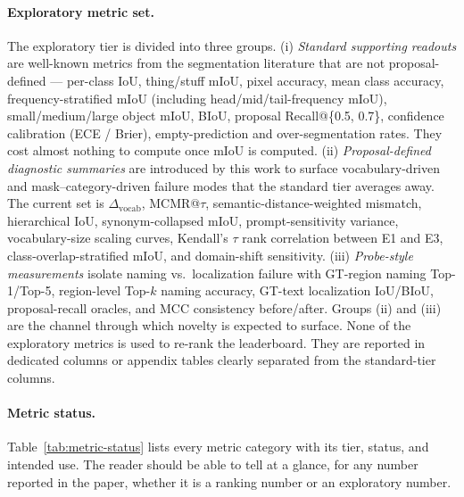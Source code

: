 \documentclass[11pt,a4paper]{article}
\begin{document}
\paragraph{Exploratory metric set.}
The exploratory tier is divided into three groups. (i) \emph{Standard supporting readouts} are well-known metrics from the segmentation literature that are not proposal-defined --- per-class IoU, thing/stuff mIoU, pixel accuracy, mean class accuracy, frequency-stratified mIoU (including head/mid/tail-frequency mIoU), small/medium/large object mIoU, BIoU, proposal Recall@\{0.5, 0.7\}, confidence calibration (ECE / Brier), empty-prediction and over-segmentation rates. They cost almost nothing to compute once mIoU is computed. (ii) \emph{Proposal-defined diagnostic summaries} are introduced by this work to surface vocabulary-driven and mask--category-driven failure modes that the standard tier averages away. The current set is $\Delta_{\mathrm{vocab}}$, MCMR@$\tau$, semantic-distance-weighted mismatch, hierarchical IoU, synonym-collapsed mIoU, prompt-sensitivity variance, vocabulary-size scaling curves, Kendall's $\tau$ rank correlation between E1 and E3, class-overlap-stratified mIoU, and domain-shift sensitivity. (iii) \emph{Probe-style measurements} isolate naming vs.\ localization failure with GT-region naming Top-1/Top-5, region-level Top-$k$ naming accuracy, GT-text localization IoU/BIoU, proposal-recall oracles, and MCC consistency before/after. Groups (ii) and (iii) are the channel through which novelty is expected to surface. None of the exploratory metrics is used to re-rank the leaderboard. They are reported in dedicated columns or appendix tables clearly separated from the standard-tier columns.

\paragraph{Metric status.}
Table~\ref{tab:metric-status} lists every metric category with its tier, status, and intended use. The reader should be able to tell at a glance, for any number reported in the paper, whether it is a ranking number or an exploratory number.
\end{document}
